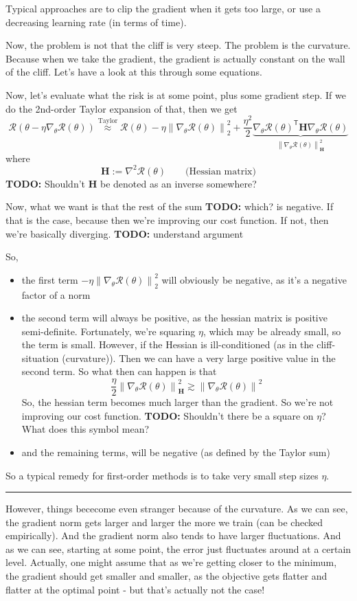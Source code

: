 \documentclass[a2paper,8pt]{extarticle}
\newcommand{\cR}{\mathcal{R}}
\newcommand{\norm}[1]{\left\lVert #1 \right\rVert}
\newcommand*{\T}{\mathsf{T}}
\newcommand{\mat}[1]{\mathbf{#1}}
\newcommand{\MH}{\mat{H}}
\newcommand{\todo}[1]{\textbf{TODO:} #1}
\newcommand{\todo}[1]{%
}
\newcommand{\sep}{\vspace{0pt}\noindent\hrule\vspace{0pt}}
\newcommand{\sep}{\vspace{5pt}\noindent\hrule\vspace{5pt}}
\begin{document}
\begin{landscape}
\begin{multicols*}{7}
Typical approaches are to clip the gradient when it gets too large, or use a
decreasing learning rate (in terms of time).

Now, the problem is not that the cliff is very steep. The problem is the
curvature. Because when we take the gradient, the gradient is actually constant
on the wall of the cliff. Let's have a look at this through some equations.

Now, let's evaluate what the risk is at some point, plus some gradient step. If
we do the 2nd-order Taylor expansion of that, then we get
\[
\cR(\theta-\eta\nabla_{\theta}\cR(\theta))
\stackrel{\text{Taylor}}{\approx}
\cR(\theta)
-\eta\norm{\nabla_\theta\cR(\theta)}_2^2
+
\frac{\eta^2}{2}
\underbrace{
\nabla_{\theta}\cR(\theta)^\T\MH
\nabla_{\theta}\cR(\theta)
}_{\norm{\nabla_\theta\cR(\theta)}_{\MH}^2}
\]
where
\[
\MH:=\nabla^2\cR(\theta)
\qquad
\text{(Hessian matrix)}
\]
\todo{Shouldn't $\MH$ be denoted as an inverse somewhere?} 

Now, what we want is that the rest of the sum \todo{which?} is negative. If that
is the case, because then we're improving our cost function. If not, then we're
basically diverging. \todo{understand argument}

So,
\begin{itemize}
  \item the first term $-\eta\norm{\nabla_\theta\cR(\theta)}_2^2$ will obviously
  be negative, as it's a negative factor of a norm
  \item the second term will always be positive, as the hessian matrix is
  positive semi-definite. Fortunately, we're squaring $\eta$, which may be
  already small, so the term is small. However, if the Hessian is
  ill-conditioned (as in the cliff-situation (curvature)). Then we can have a
  very large positive value in the second term. So what then can happen is that
  \[
  \frac{\eta}{2}\norm{\nabla_\theta\cR(\theta)}_{\MH}^2
  \gtrsim
  \norm{\nabla_\theta\cR(\theta)}^2
  \]
  So, the hessian term becomes much larger than the gradient. So we're not
  improving our cost function.
  \todo{Shouldn't there be a square on $\eta$? What does this symbol mean?}
  \item and the remaining terms, will be negative (as defined by the Taylor sum)
\end{itemize}

So a typical remedy for first-order methods is to take very small step sizes
$\eta$.

\sep

However, things bececome even stranger because of the curvature. As we can see,
the gradient norm gets larger and larger the more we train (can be checked
empirically). And the gradient norm also tends to have larger fluctuations. And
as we can see, starting at some point, the error just fluctuates around at a
certain level. Actually, one might assume that as we're getting closer to the
minimum, the gradient should get smaller and smaller, as the objective gets
flatter and flatter at the optimal point - but that's actually not the case!


\end{multicols*}
\end{landscape}
\end{document}
